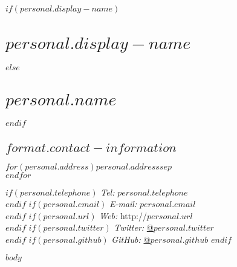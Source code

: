 \documentclass[%
  $if(format.pdf-options.memoir-mode.papersize)$
    $format.pdf-options.memoir-mode.papersize$paper,
  $endif$
  $format.pdf-options.memoir-mode.typesize$,
  oneside
  ]{memoir}
\begin{document}
  $if(personal.display-name)$
    \chapter*{$personal.display-name$}
  $else$
    \chapter*{$personal.name$}
  $endif$

  \hypertarget{contact-information}{
  \section{$format.contact-information$}\label{contact-information}}
    \begin{minipage}[t]{0.3\textwidth}
      $for(personal.address)$$personal.address$$sep$\\ $endfor$
    \end{minipage}
    \begin{minipage}[t]{0.7\textwidth}
        $if(personal.telephone)$
        {\textit{Tel:}} $personal.telephone$ \\
        $endif$
        $if(personal.email)$
        {\textit{E-mail:}} $personal.email$ \\
        $endif$
        $if(personal.url)$
        {\textit{Web:}} http://$personal.url$ \\
        $endif$
        $if(personal.twitter)$
        {\textit{Twitter:}} \href{http://twitter.com/$personal.twitter$}{@$personal.twitter$} \\
        $endif$
        $if(personal.github)$
        {\textit{GitHub:}} \href{http://github.com/$personal.github$}{@$personal.github$}
        $endif$
    \end{minipage}
\vspace{-\baselineskip} %
$body$
\end{document}
